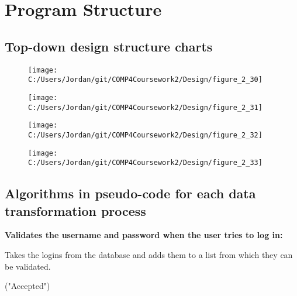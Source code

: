 \section{Program Structure}

\subsection{Top-down design structure charts}

\begin{figure}[H]
    \label{fig:print_function_result}\caption{}
    \texttt{[image: C:/Users/Jordan/git/COMP4Coursework2/Design/figure\_2\_30]}
\end{figure}

\begin{figure}[H]
    \label{fig:print_function_result}\caption{}
    \texttt{[image: C:/Users/Jordan/git/COMP4Coursework2/Design/figure\_2\_31]}
\end{figure}

\begin{figure}[H]
    \label{fig:print_function_result}\caption{}
    \texttt{[image: C:/Users/Jordan/git/COMP4Coursework2/Design/figure\_2\_32]}
\end{figure}

\begin{figure}[H]
    \label{fig:print_function_result}\caption{}
    \texttt{[image: C:/Users/Jordan/git/COMP4Coursework2/Design/figure\_2\_33]}
\end{figure}

\subsection{Algorithms in pseudo-code for each data transformation process}

\textbf{Validates the username and password when the user tries to log in:}

\begin{algorithm}[H]
\caption{Takes the logins from the database and adds them to a list from which they can be validated.}
\begin{algorithmic}[1]
\EndFor
{}
		\SEND("Accepted")
	\Else{}
	\EndIf
\EndWhile
\end{algorithmic}
\end{algorithm}

